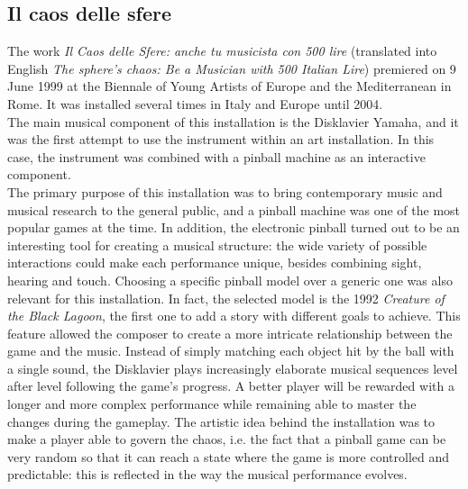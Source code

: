 \subsection*{Il caos delle sfere}
The work \textit{Il Caos delle Sfere: anche tu musicista con 500 lire} (translated into English \textit{The sphere’s chaos: Be a Musician with 500 Italian Lire}) premiered on 9 June 1999 at the Biennale of Young Artists of Europe and the Mediterranean in Rome. It was installed several times in Italy and Europe until 2004.\\
The main musical component of this installation is the Disklavier Yamaha, and it was the first attempt to use the instrument within an art installation. In this case, the instrument was combined with a pinball machine as an interactive component.\\
The primary purpose of this installation was to bring contemporary music and musical research to the general public, and a pinball machine was one of the most popular games at the time. In addition, the electronic pinball turned out to be an interesting tool for creating a musical structure: the wide variety of possible interactions could make each performance unique, besides combining sight, hearing and touch. Choosing a specific pinball model over a generic one was also relevant for this installation. In fact, the selected model is the 1992 \textit{Creature of the Black Lagoon}, the first one to add a story with different goals to achieve. This feature allowed the composer to create a more intricate relationship between the game and the music. Instead of simply matching each object hit by the ball with a single sound, the Disklavier plays increasingly elaborate musical sequences level after level following the game's progress. A better player will be rewarded with a longer and more complex performance while remaining able to master the changes during the gameplay. The artistic idea behind the installation was to make a player able to govern the chaos, i.e. the fact that a pinball game can be very random so that it can reach a state where the game is more controlled and predictable: this is reflected in the way the musical performance evolves.\\
